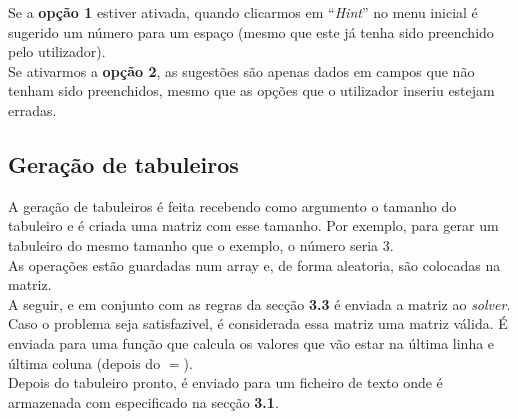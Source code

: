 \documentclass{article}
\begin{document}
Se a {\bf{opção 1}} estiver ativada, quando clicarmos em ``{\it{Hint}}'' no menu inicial é sugerido um número para um espaço (mesmo que este já tenha sido preenchido pelo utilizador).
\\

Se ativarmos a {\bf{opção 2}}, as sugestões são apenas dados em campos que não tenham sido preenchidos, mesmo que as opções que o utilizador inseriu estejam erradas. 


\subsection{Geração de tabuleiros}

A geração de tabuleiros é feita recebendo como argumento o tamanho do tabuleiro e é criada uma matriz com esse tamanho. Por exemplo, para gerar um tabuleiro do mesmo tamanho que o exemplo, o número seria 3.
\\

As operações estão guardadas num array e, de forma aleatoria, são colocadas na matriz. 
\\

A seguir, e em conjunto com as regras da secção {\bf{3.3}} é enviada a matriz ao {\it{solver}}. Caso o problema seja satisfazivel, é considerada essa matriz uma matriz válida. É enviada para uma função que calcula os valores que vão estar na última linha e última coluna (depois do $=$). 
\\

Depois do tabuleiro pronto, é enviado para um ficheiro de texto onde é armazenada com especificado na secção {\bf{3.1}}.
\end{document}
